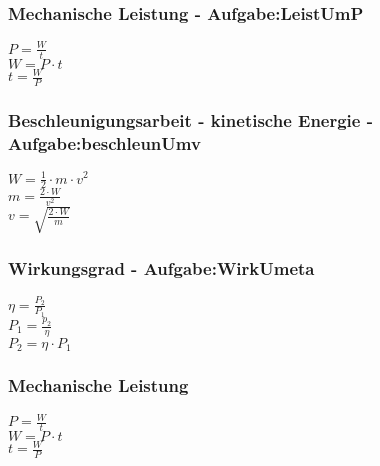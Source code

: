\subsubsection{Mechanische Leistung - Aufgabe:LeistUmP} 
\begin{minipage}{0.45\textwidth} 
$ P = \frac{W}{t} $\\ 
$ W = P\cdot t $\\ 
$ t = \frac{W}{P} $\\ 
\end{minipage} 
\begin{minipage}{0.45\textwidth} 
 
\end{minipage} 
\subsubsection{Beschleunigungsarbeit - kinetische Energie - Aufgabe:beschleunUmv} 
\begin{minipage}{0.45\textwidth} 
$ W = \frac{1}{2}\cdot m\cdot v^{2} $\\ 
$ m = \frac{2\cdot W}{ v^{2} } $\\ 
$ v = \sqrt{\frac{2\cdot W}{ m}} $\\ 
\end{minipage} 
\begin{minipage}{0.45\textwidth} 
 
\end{minipage} 
\subsubsection{Wirkungsgrad - Aufgabe:WirkUmeta} 
\begin{minipage}{0.45\textwidth} 
$ \eta  = \frac{P_{2} }{P_{1} } $\\ 
$ P_{1}  = \frac{p_{2} }{\eta } $\\ 
$ P_{2}  = \eta \cdot P_{1} $\\ 
\end{minipage} 
\begin{minipage}{0.45\textwidth} 
 
\end{minipage} 
\subsubsection{Mechanische Leistung} 
\begin{minipage}{0.45\textwidth} 
$ P = \frac{W}{t} $\\ 
$ W = P\cdot t $\\ 
$ t = \frac{W}{P} $\\ 
\end{minipage} 
\begin{minipage}{0.45\textwidth} 
 
\end{minipage} 
